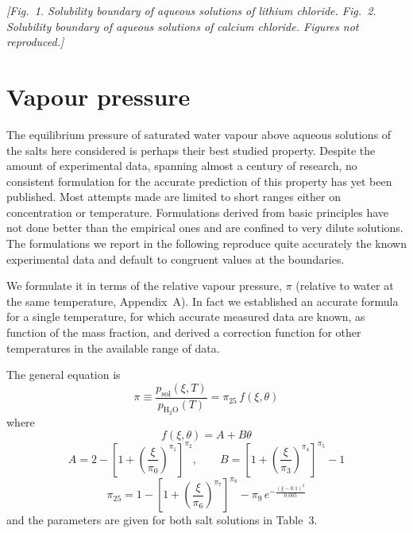 \documentclass[11pt]{article}
\begin{document}
\textit{[Fig.~1. Solubility boundary of aqueous solutions of lithium chloride. Fig.~2.
Solubility boundary of aqueous solutions of calcium chloride. Figures not reproduced.]}

\section{Vapour pressure}

The equilibrium pressure of saturated water vapour above aqueous solutions of the salts
here considered is perhaps their best studied property. Despite the amount of experimental
data, spanning almost a century of research, no consistent formulation for the accurate
prediction of this property has yet been published. Most attempts made are limited to
short ranges either on concentration or temperature. Formulations derived from basic
principles have not done better than the empirical ones and are confined to very dilute
solutions. The formulations we report in the following reproduce quite accurately the
known experimental data and default to congruent values at the boundaries.

We formulate it in terms of the relative vapour pressure, $\pi$ (relative to water at the
same temperature, Appendix~A). In fact we established an accurate formula for a single
temperature, for which accurate measured data are known, as function of the mass fraction,
and derived a correction function for other temperatures in the available range of data.

The general equation is
\begin{equation}
\pi \equiv \frac{p_{\mathrm{sol}}(\xi, T)}{p_{\mathrm{H_2O}}(T)} = \pi_{25}\, f(\xi,\theta)
\end{equation}
where
\begin{equation}
f(\xi,\theta) = A + B\theta
\end{equation}
\begin{equation}
A = 2 - \left[1 + \left(\frac{\xi}{\pi_0}\right)^{\pi_1}\right]^{\pi_2}, \qquad
B = \left[1 + \left(\frac{\xi}{\pi_3}\right)^{\pi_4}\right]^{\pi_5} - 1
\end{equation}
\begin{equation}
\pi_{25} = 1 - \left[1 + \left(\frac{\xi}{\pi_6}\right)^{\pi_7}\right]^{\pi_8} -
\pi_9\, e^{-\frac{(\xi - 0.1)^2}{0.005}}
\end{equation}
and the parameters are given for both salt solutions in Table~3.
\end{document}

